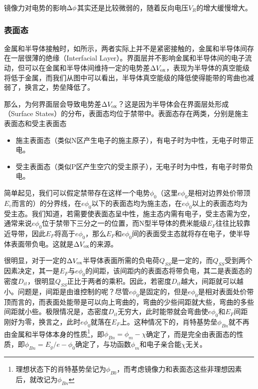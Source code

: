 镜像力对电势的影响$\Delta{\phi}$其实还是比较微弱的，随着反向电压$V_R$的增大缓慢增大。

\subsubsection{表面态}
金属和半导体接触时，如所示，两者实际上并不是紧密接触的，金属和半导体间存在一层很薄的绝缘（Interfacial Layer）。界面层并不影响金属和半导体间的电子流动，但可以在金属和半导体间维持一定的电势差$\Delta{V_{\text{ox}}}$，表现为半导体的真空能级将低于金属，而我们从图中可以看出，半导体真空能级的降低使得能带的弯曲也减弱了，换言之，势垒降低了。

那么，为何界面层会导致电势差$\Delta{V_{\text{ox}}}$？这是因为半导体会在界面层处形成（Surface States）的分布，表面态均位于禁带中。表面态存在两类，分别是施主表面态和受主表面态
\begin{itemize}
    \item 施主表面态（类似N区产生电子的施主原子），有电子时为中性，无电子时带正电。
    \item 受主表面态（类似P区产生空穴的受主原子），无电子时为中性，有电子时带负电。
\end{itemize}
简单起见，我们可以假定禁带存在这样一个电势$\phi_0$（这里$e\phi_0$是相对边界处价带顶$E_v$而言的）的分界线，在$e\phi_0$以下的表面态均为施主态，在$e\phi_0$以上的表面态均为受主态。我们知道，若需要使表面态呈中性，施主态内需有电子，受主态需为空，通常来说$e\phi_0$位于禁带下三分之一的位置，而N型半导体的费米能级$E_F$往往比较靠近导带，因此$E_F$将高于$e\phi_0$，那么$E_F$和$e\phi_0$间的表面受主态就将存在电子，使半导体表面带负电。这就是$\Delta{V_{\text{ox}}}$的来源。

很明显，对于一定的$\Delta{V_{\text{ox}}}$半导体表面所需的负电荷$Q_{SS}$是一定的，而$Q_{SS}$受到两个因素决定，其一是$E_F$与$e\phi_0$的间距，该间距内的表面态将带负电，其二是表面态的密度$D_{it}$，很明显$Q_{SS}$正比于两者的乘积。因此，若密度$D_{it}$越大，间距就可以越小。问题是，间距是由谁控制的呢？尽管$e\phi_0$是固定的，但是$e\phi_0$是相对表面处价带顶而言的，而表面处能带是可以向上弯曲的，弯曲的少些间距就大些，弯曲的多些间距就小些。极限情况是，态密度$D_{it}$无穷大，此时能带就会弯曲使$e\phi_0$和$E_F$间距刚好为零，换言之，此时$e\phi_0$就落在$E_F$上。这种情况下的，肖特基势垒$\phi_{Bn}$就不再由金属和半导体本身的性质\footnote{理想状态下的肖特基势垒记为$\phi_{B0}$，而考虑镜像力和表面态这些非理想因素后，就改记为$\phi_{Bn}$}，即$\phi_{Bn}=\phi_m-\chi$确定了，而是完全由表面态的性质，即$\phi_{Bn}=E_g/e-\phi_0$确定了，与功函数$\phi_m$和电子亲合能$\chi$无关。

